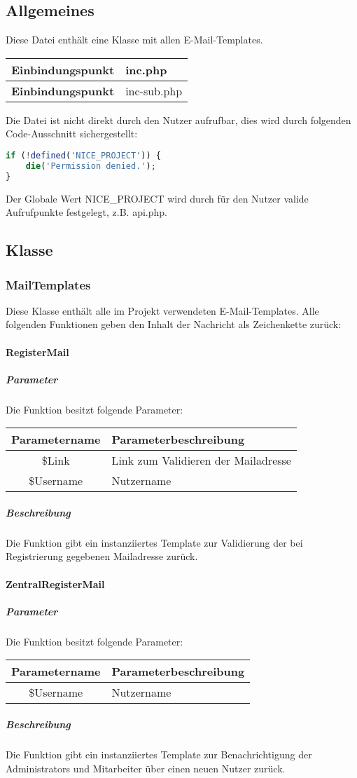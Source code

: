 \subsection{Allgemeines} Diese Datei enthält eine Klasse mit allen E-Mail-Templates.
\begin{table}[H]
	\begin{tabular}{|c|p{11cm}|}
		\hline
		\textbf{Einbindungspunkt} & inc.php \\ \hline
		\textbf{Einbindungspunkt} & inc-sub.php \\ \hline
	\end{tabular}
\end{table}
Die Datei ist nicht direkt durch den Nutzer aufrufbar, dies wird durch folgenden Code-Ausschnitt sichergestellt:
\begin{lstlisting}[language=php]
if (!defined('NICE_PROJECT')) {
	die('Permission denied.');
}
\end{lstlisting}
Der Globale Wert {\glqq NICE\_PROJECT\grqq} wird durch für den Nutzer valide Aufrufpunkte festgelegt, z.B. {\glqq api.php\grqq}.
\newpage
\subsection{Klasse}
\subsubsection{MailTemplates} Diese Klasse enthält alle im Projekt verwendeten E-Mail-Templates. Alle folgenden Funktionen geben den Inhalt der Nachricht als Zeichenkette zurück:
\paragraph{RegisterMail}
\subparagraph{Parameter} Die Funktion besitzt folgende Parameter:
\begin{table}[H]
	\begin{tabular}{|c|p{11cm}|}
		\hline
		\textbf{Parametername} & \textbf{Parameterbeschreibung} \\ \hline
		\$Link     & Link zum Validieren der Mailadresse \\ \hline
		\$Username & Nutzername \\ \hline
	\end{tabular}
\end{table}
\subparagraph{Beschreibung} Die Funktion gibt ein instanziiertes Template zur Validierung der bei Registrierung gegebenen Mailadresse zurück.
\paragraph{ZentralRegisterMail}
\subparagraph{Parameter} Die Funktion besitzt folgende Parameter:
\begin{table}[H]
	\begin{tabular}{|c|p{11cm}|}
		\hline
		\textbf{Parametername} & \textbf{Parameterbeschreibung} \\ \hline
		\$Username & Nutzername \\ \hline
	\end{tabular}
\end{table}
\subparagraph{Beschreibung} Die Funktion gibt ein instanziiertes Template zur Benachrichtigung der Administrators und Mitarbeiter über einen neuen Nutzer zurück.
